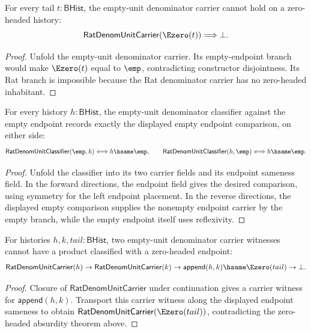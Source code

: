 \begin{theorem}
\label{thm:rat-denom-unit-carrier-e0-absurd}
For every tail $t:\mathsf{BHist}$, the empty-unit denominator carrier cannot
hold on a zero-headed history:
$$
\mathsf{RatDenomUnitCarrier}(\Ezero(t))\Longrightarrow \bot.
$$
\end{theorem}
\begin{proof}
Unfold the empty-unit denominator carrier. Its empty-endpoint branch would make
$\Ezero(t)$ equal to $\emp$, contradicting constructor disjointness. Its Rat
branch is impossible because the Rat denominator carrier has no zero-headed
inhabitant.
\end{proof}

\begin{theorem}
\label{thm:rat-denom-unit-classifier-empty-endpoint-iff}
For every history $h:\mathsf{BHist}$, the empty-unit denominator classifier
against the empty endpoint records exactly the displayed empty endpoint
comparison, on either side:
$$
\mathsf{RatDenomUnitClassifier}(\emp,h)\Longleftrightarrow h\hsame\emp,
\qquad
\mathsf{RatDenomUnitClassifier}(h,\emp)\Longleftrightarrow h\hsame\emp.
$$
\end{theorem}
\begin{proof}
Unfold the classifier into its two carrier fields and its endpoint sameness
field. In the forward directions, the endpoint field gives the desired
comparison, using symmetry for the left endpoint placement. In the reverse
directions, the displayed empty comparison supplies the nonempty endpoint
carrier by the empty branch, while the empty endpoint itself uses reflexivity.
\end{proof}

\begin{theorem}
\label{thm:rat-denom-unit-carrier-append-e0-absurd}
For histories $h,k,tail:\mathsf{BHist}$, two empty-unit denominator carrier
witnesses cannot have a product classified with a zero-headed endpoint:
$$
\mathsf{RatDenomUnitCarrier}(h)\to
\mathsf{RatDenomUnitCarrier}(k)\to
\mathsf{append}(h,k)\hsame\Ezero(tail)\to\bot.
$$
\end{theorem}
\begin{proof}
Closure of $\mathsf{RatDenomUnitCarrier}$ under continuation gives a carrier
witness for $\mathsf{append}(h,k)$. Transport this carrier witness along the
displayed endpoint sameness to obtain
$\mathsf{RatDenomUnitCarrier}(\Ezero(tail))$, contradicting the zero-headed
absurdity theorem above.
\end{proof}

